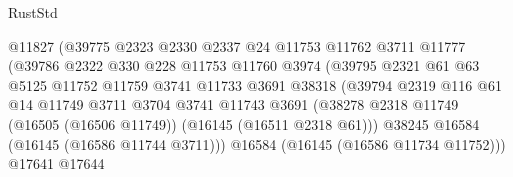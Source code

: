\begin{lexlean}{RustStd}
\begin{coremodule}
                                      @11827
                                      (@39775
                                        @2323
                                        @2330
                                        @2337
                                        @24
                                        @11753
                                        @11762
                                        @3711
                                        @11777
                                        (@39786
                                          @2322
                                          @330
                                          @228
                                          @11753
                                          @11760
                                          @3974
                                          (@39795
                                            @2321
                                            @61
                                            @63
                                            @5125
                                            @11752
                                            @11759
                                            @3741
                                            @11733
                                            @3691
                                            @38318
                                            (@39794
                                              @2319
                                              @116
                                              @61
                                              @14
                                              @11749
                                              @3711
                                              @3704
                                              @3741
                                              @11743
                                              @3691
                                              (@38278
                                                @2318
                                                @11749
                                                (@16505 (@16506 @11749))
                                                (@16145 (@16511 @2318 @61)))
                                              @38245
                                              @16584
                                              (@16145 (@16586 @11744 @3711)))
                                            @16584
                                            (@16145 (@16586 @11734 @11752)))
                                          @17641
                                          @17644

\end{coremodule}
\end{lexlean}
